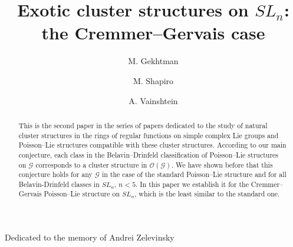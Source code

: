 \documentclass{amsart}
\theoremstyle{definition}
\theoremstyle{remark}
\numberwithin{equation}{section}
\numberwithin{theorem}{section}
\begin{document}
\dedicatory
{Dedicated to the memory of Andrei Zelevinsky}

\title[Exotic cluster structure on $SL_n$]
{Exotic cluster structures on $SL_n$: the Cremmer--Gervais case}

\author{M. Gekhtman}

\address{Department of Mathematics, University of Notre Dame, Notre Dame,
IN 46556}

\author{M. Shapiro}
\address{Department of Mathematics, Michigan State University, East Lansing,
MI 48823}

\author{A. Vainshtein}
\address{Department of Mathematics \& Department of Computer Science, University of Haifa, Haifa,
Mount Carmel 31905, Israel}

\begin{abstract} This is the second paper in the series of papers dedicated to
the study of natural cluster structures in the rings of regular functions on simple complex Lie groups and Poisson--Lie
structures compatible with these cluster structures.
According to our main conjecture, each class in the Belavin--Drinfeld classification of Poisson--Lie structures on ${{\mathcal G}}$ corresponds to a cluster structure in ${{\mathcal O}}({{\mathcal G}})$. 
We have shown before that this conjecture holds for any ${{\mathcal G}}$ in the case of the standard Poisson--Lie structure   and for all Belavin-Drinfeld classes in $SL_n$, $n<5$.
In this paper we establish it for the Cremmer--Gervais
Poisson--Lie structure on $SL_n$, which is the least similar to the standard one. 
\end{abstract}


\maketitle

\tableofcontents
\end{document}
